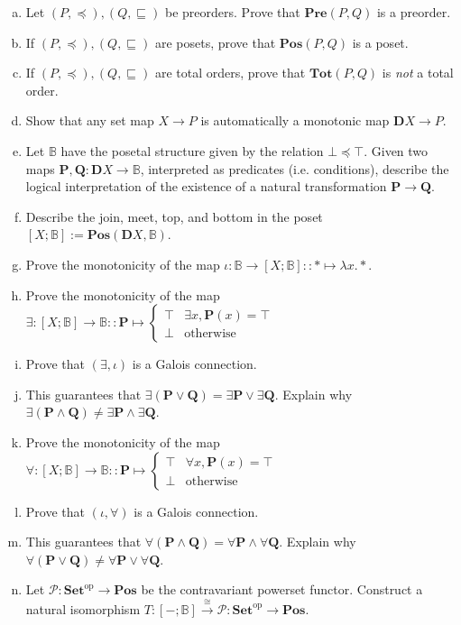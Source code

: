 \documentclass{amsart}
\theoremstyle{remark}
\theoremstyle{definition}
\theoremstyle{definition}
\newcommand{\To}[1]{\xrightarrow{#1}}
\def\op{^{\text{op}}}
\def\Set{\mathbf{Set}}
\def\Pos{\mathbf{Pos}}
\def\Pre{\mathbf{Pre}}
\def\Tot{\mathbf{Tot}}
\def\BP{\mathbf P}
\def\BQ{\mathbf Q}
\def\BB{\mathbb B}
\begin{document}
\begin{enumerate}[(a)]
\item Let $(P,\preceq),(Q,\sqsubseteq)$ be preorders. Prove that $\Pre(P,Q)$ is a preorder.

\item If $(P,\preceq),(Q,\sqsubseteq)$ are posets, prove that $\Pos(P,Q)$ is a poset.

\item If $(P,\preceq),(Q,\sqsubseteq)$ are total orders, prove that $\Tot(P,Q)$ is \emph{not} a total order.

\item Show that any set map $X\to P$ is automatically a monotonic map $\mathbf{D}X\to P$.

\item Let $\BB$ have the posetal structure given by the relation $\bot\preceq\top$. Given two maps $\BP,\BQ:\mathbf{D}X\to\BB$, interpreted as predicates (i.e. conditions), describe the logical interpretation of the existence of a natural transformation $\BP\to \BQ$.

\item Describe the join, meet, top, and bottom in the poset $[X;\BB]:=\Pos(\mathbf{D}X,\BB)$.

\item Prove the monotonicity of the map $\iota:\BB\to[X;\BB]::*\mapsto\lambda x.*$.

\item Prove the monotonicity of the map $\exists:[X;\BB]\to\BB::\BP\mapsto\begin{cases}\top & \exists x, \BP(x)=\top \\ \bot &\text{otherwise}\end{cases}$

\item Prove that $(\exists,\iota)$ is a Galois connection.

\item This guarantees that $\exists(\BP\vee \BQ)=\exists \BP\vee \exists \BQ$. Explain why $\exists(\BP\wedge \BQ)\neq \exists \BP\wedge \exists\BQ$.

\item Prove the monotonicity of the map $\forall:[X;\BB]\to\BB::\BP\mapsto\begin{cases}\top & \forall x, \BP(x)=\top \\ \bot &\text{otherwise}\end{cases}$

\item Prove that $(\iota,\forall)$ is a Galois connection.

\item This guarantees that $\forall(\BP\wedge \BQ)=\forall \BP\wedge \forall \BQ$. Explain why $\forall(\BP\vee \BQ)\neq \forall \BP\vee \forall \BQ$.

\item Let $\mathcal{P}:\Set\op\to\Pos$ be the contravariant powerset functor. Construct a natural isomorphism $T:[-;\BB]\To{\cong}\mathcal{P}:\Set\op\to\Pos$.

\end{enumerate}
\end{document}
